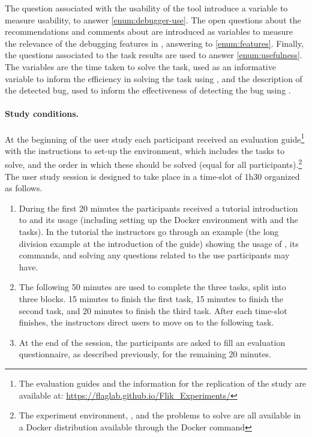 The question associated with the usability of the tool introduce a variable to measure usability, to 
answer \ref{enum:debugger-use}. The open questions about the recommendations and comments 
about \flik are introduced as variables to measure the relevance of the debugging features in \flik, 
answering to \ref{enum:features}. 
Finally, the questions associated to the task results are used to answer \ref{enum:usefulness}. The 
variables are the time taken to solve the task, used as an informative variable to inform the efficiency 
in solving the task using \flik, and the description of the detected bug, used to inform the effectiveness 
of detecting the bug using \flik.

\paragraph{\textbf{Study conditions.}}

At the beginning of the user study each participant received an evaluation guide\footnote{The evaluation guides and the information for the replication of the study are available at: \url{https://flaglab.github.io/Flik_Experiments/}} with the instructions to set-up the \flik environment, which 
includes the tasks to solve, and the order in which these should be solved (equal for all participants).\footnote{The experiment environment, \flik, and the problems to solve are all available in a Docker distribution available through the Docker command }
The user study session is designed to take place in a time-slot of 1h30 organized as follows. 
\begin{enumerate}[label=\textbf{\arabic*.}]
  \item During the first 20 minutes the participants received a tutorial introduction to \flik and its 
  usage (including setting up the Docker environment with \flik and the tasks). In the tutorial the 
  instructors go through an example (\ie the long division example at the introduction of the guide) 
  showing the usage of \flik, its commands, and solving any questions related to the use participants 
  may have.
  \item The following 50 minutes are used to complete the three tasks, split into three blocks. 15 
  minutes to finish the first task, 15 minutes to finish the second task, and 20 minutes to finish the 
  third task. After each time-slot finishes, the instructors direct users to move on to the following task.
  \item At the end of the session, the participants are asked to fill an evaluation questionnaire, as 
  described previously, for the remaining 20 minutes. 
\end{enumerate}

